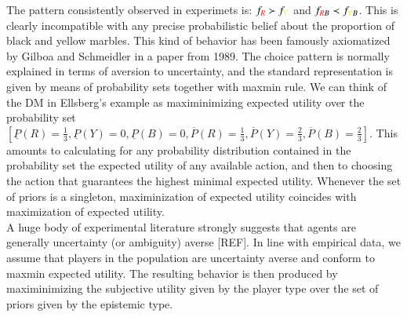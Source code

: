 \documentclass[fleqn,reqno,11pt]{article}
\begin{document}
The pattern consistently observed in experimets is: $f_{{\color{red}R}} \succ f_{{\color{yellow}Y}}$ and $f_{{\color{red}R}B} \prec f_{{\color{yellow}Y}B}$. This is clearly incompatible with any precise probabilistic belief about the proportion of black and yellow marbles. This kind of behavior has been
famously axiomatized by Gilboa and Schmeidler in a paper from 1989. The choice pattern is normally explained in terms of aversion to uncertainty, and the standard representation is given by means of probability sets together with maxmin rule. We can think of the DM in Ellsberg's example as maximinimizing expected utility over the probability set $ [\underline{P}(R)=\frac{1}{3},\underline{P}(Y)=0,\underline{P}(B)=0,\overline{P}(R)=\frac{1}{3},\overline{P}(Y)=\frac{2}{3},\overline{P}(B)=\frac{2}{3}]  $. This amounts to calculating for any probability distribution contained in the probability set the expected utility of any available action, and then to choosing the action that guarantees the highest minimal expected utility. Whenever the set of priors is a singleton, maximinization of
expected utility coincides with maximization of expected utility.\\
A huge body of experimental literature strongly suggests that agents are generally uncertainty
(or ambiguity) averse [REF]. In line with empirical data,
we assume that players in the population are uncertainty averse and conform to maxmin expected
utility. The resulting behavior is then produced by maximinimizing the subjective utility
given by the player type over the set of priors given by the epistemic type.

\end{document}
